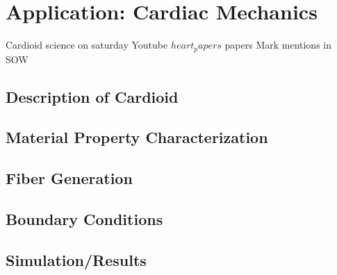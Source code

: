 \chapter{Application: Cardiac Mechanics}
%

Cardioid science on saturday Youtube
$heart_papers$
papers Mark mentions in SOW

\section{Description of Cardioid}
\label{Description of Cardioid}

\section{Material Property Characterization}
\label{Material Property Characterization}

\section{Fiber Generation}
\label{Simulation}

\section{Boundary Conditions}
\label{Boundary Conditions}

\section{Simulation/Results}
\label{Simulation/Results}

